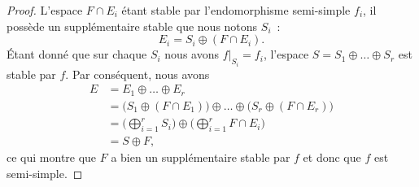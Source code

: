 \begin{proof}
	L'espace \( F\cap E_i\) étant stable par l'endomorphisme semi-simple \( f_i\), il possède un supplémentaire stable que nous notons \( S_i\)~:
	\begin{equation}
		E_i=S_i\oplus(F\cap E_i).
	\end{equation}
	Étant donné que sur chaque \( S_i\) nous avons \( f|_{S_i}=f_i\), l'espace \( S=S_1\oplus\ldots\oplus S_r\) est stable par \( f\). Par conséquent, nous avons
	\begin{subequations}
		\begin{align}
			E & = E_1\oplus\ldots\oplus E_r                                                          \\
			  & = \big( S_1\oplus(F\cap E_1) \big)\oplus\ldots\oplus\big( S_r\oplus(F\cap E_r) \big) \\
			  & = \big( \bigoplus_{i=1}^rS_i \big)\oplus\big( \bigoplus_{i=1}^rF\cap E_i \big)       \\
			  & = S\oplus F,
		\end{align}
	\end{subequations}
	ce qui montre que \( F\) a bien un supplémentaire stable par \( f\) et donc que \( f\) est semi-simple.
\end{proof}

